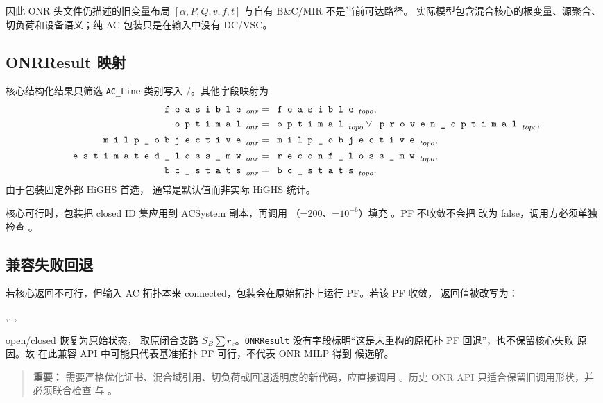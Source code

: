 因此 ONR 头文件仍描述的旧变量布局 $[\alpha,P,Q,v,f,t]$ 与自有 B\&C/MIR 不是当前可达路径。
实际模型包含混合核心的根变量、源聚合、切负荷和设备语义；纯 AC 包装只是在输入中没有 DC/VSC。

\subsection{ONRResult 映射}

核心结构化结果只筛选 \texttt{AC\_Line} 类别写入
/。其他字段映射为
\begin{align}
\fld{feasible}_{onr}&=\fld{feasible}_{topo},\\
\fld{optimal}_{onr}&=\fld{optimal}_{topo}\lor\fld{proven\_optimal}_{topo},\\
\fld{milp\_objective}_{onr}&=\fld{milp\_objective}_{topo},\\
\fld{estimated\_loss\_mw}_{onr}&=\fld{reconf\_loss\_mw}_{topo},\\
\fld{bc\_stats}_{onr}&=\fld{bc\_stats}_{topo}.
\end{align}
由于包装固定外部 HiGHS 首选， 通常是默认值而非实际 HiGHS 统计。

核心可行时，包装把 closed ID 集应用到 ACSystem 副本，再调用
（=200、=$10^{-6}$）填充
。PF 不收敛不会把  改为 false，调用方必须单独检查
。

\subsection{兼容失败回退}

若核心返回不可行，但输入 AC 拓扑本来 connected，包装会在原始拓扑上运行 PF。若该 PF 收敛，
返回值被改写为：
\begin{center}
,\quad {},\quad
{},
\end{center}
open/closed 恢复为原始状态， 取原闭合支路
$S_B\sum r_e$。\texttt{ONRResult} 没有字段标明“这是未重构的原拓扑 PF 回退”，也不保留核心失败
原因。故  在此兼容 API 中可能只代表基准拓扑 PF 可行，不代表 ONR MILP 得到
候选解。

\begin{quote}\small\textbf{重要：}
需要严格优化证书、混合域引用、切负荷或回退透明度的新代码，应直接调用
。历史 ONR API 只适合保留旧调用形状，并必须联合检查
 与 。
\end{quote}

